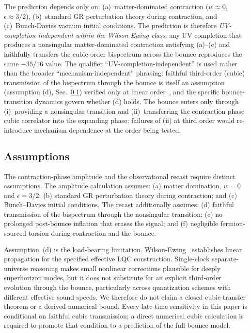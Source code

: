 \documentclass[aps,prd,twocolumn,superscriptaddress,showpacs,preprintnumbers,nofootinbib,longbibliography,floatfix]{revtex4-2}
\begin{document}
The prediction depends only on: (a)~matter-dominated contraction ($w \approx 0$, $\epsilon \approx 3/2$), (b)~standard GR perturbation theory during contraction, and (c)~Bunch-Davies vacuum initial conditions. The prediction is therefore \emph{UV-completion-independent within the Wilson-Ewing class}: any UV completion that produces a nonsingular matter-dominated contraction satisfying (a)--(c) and faithfully transfers the cubic-order bispectrum across the bounce reproduces the same $-35/16$ value. The qualifier ``UV-completion-independent'' is used rather than the broader ``mechanism-independent'' phrasing: faithful third-order (cubic) transmission of the bispectrum through the bounce is itself an assumption (assumption (d), Sec.~\ref{sec:assumptions}) verified only at linear order~\cite{WilsonEwing:2012}, and the specific bounce-transition dynamics govern whether (d) holds. The bounce enters only through (i)~providing a nonsingular transition and (ii)~transferring the contraction-phase cubic correlator into the expanding phase; failures of (ii) at third order would re-introduce mechanism dependence at the order being tested.

\subsection{Assumptions}\label{sec:assumptions}

The contraction-phase amplitude and the observational recast require distinct assumptions. The amplitude calculation assumes: (a) matter domination, $w=0$ and $\epsilon=3/2$; (b) standard GR perturbation theory during contraction; and (c) Bunch--Davies initial conditions. The recast additionally assumes: (d) faithful transmission of the bispectrum through the nonsingular transition; (e) no prolonged post-bounce inflation that erases the signal; and (f) negligible fermion-sourced torsion during contraction and the bounce.

Assumption~(d) is the load-bearing limitation. Wilson-Ewing~\cite{WilsonEwing:2012} establishes linear propagation for the specified effective LQC construction. Single-clock separate-universe reasoning makes small nonlinear corrections plausible for deeply superhorizon modes, but it does not substitute for an explicit third-order evolution through the bounce, particularly across quantization schemes with different effective sound speeds. We therefore do not claim a closed cubic-transfer theorem or a derived numerical bound. Every late-time sensitivity in this paper is conditional on faithful cubic transmission; a direct numerical cubic calculation is required to promote that condition to a prediction of the full bounce model.
\end{document}
